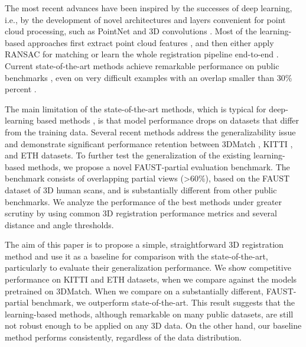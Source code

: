 \documentclass{bmvc2k}
\begin{document}
The most recent advances have been inspired by the successes of deep learning, i.e., by the development of novel architectures and layers convenient for point cloud processing, such as PointNet \cite{pointnet} and 3D convolutions \cite{3d-convolutional-network-for-human-action, c3d-3d-convolutional-networks}. Most of the learning-based approaches first extract point cloud features \cite{dcp-learning-representation-for-registration, prnet-self-supervised--for-partial-to-partial-registration, robust-point-cloud-registration-deep-graph-matching, pcam-product-of-cross-attention-matrices}, and then either apply RANSAC for matching \cite{3dmatch, predator, d3feat-joint-learning-of-dense-features} or learn the whole registration pipeline end-to-end \cite{pointnetlk-robust-and-efficient-registration-using-pointnet, pointnetlk-revisited, omnet-learning-overlapping-mask}. Current state-of-the-art methods \cite{predator, geometric-transformer-for-fast-registration, REGTR, SpinNet, DIP, YOHO, d3feat-joint-learning-of-dense-features} achieve remarkable performance on public benchmarks \cite{3dmatch, KITTI, ETH, modelnet40}, even on very difficult examples with an overlap smaller than 30\% percent \cite{predator}. 



The main limitation of the state-of-the-art methods, which is typical for deep-learning based methods \cite{exploring-generalization-in-deep-learning, generalization-in-deep-learning}, is that model performance drops on datasets that differ from the training data. Several recent methods \cite{SpinNet, DIP, geometric-transformer-for-fast-registration, PointDSC} address the generalizability issue and demonstrate significant performance retention between 3DMatch \cite{3dmatch}, KITTI \cite{KITTI}, and ETH \cite{ETH} datasets. To further test the generalization of the existing learning-based methods, we propose a novel FAUST-partial evaluation benchmark. The benchmark consists of overlapping partial views (>60\%), based on the FAUST dataset \cite{FAUST} of 3D human scans, and is substantially different from other public benchmarks. We analyze the performance of the best methods under greater scrutiny by using common 3D registration performance metrics and several distance and angle thresholds.

The aim of this paper is to propose a simple, straightforward 3D registration method and use it as a baseline for comparison with the state-of-the-art, particularly to evaluate their generalization performance. We show competitive performance on KITTI and ETH datasets, when we compare against the models pretrained on 3DMatch. When we compare on a substantially different, FAUST-partial benchmark, we outperform state-of-the-art. This result suggests that the learning-based methods, although remarkable on many public datasets, are still not robust enough to be applied on any 3D data. On the other hand, our baseline method performs consistently, regardless of the data distribution. 
\end{document}

